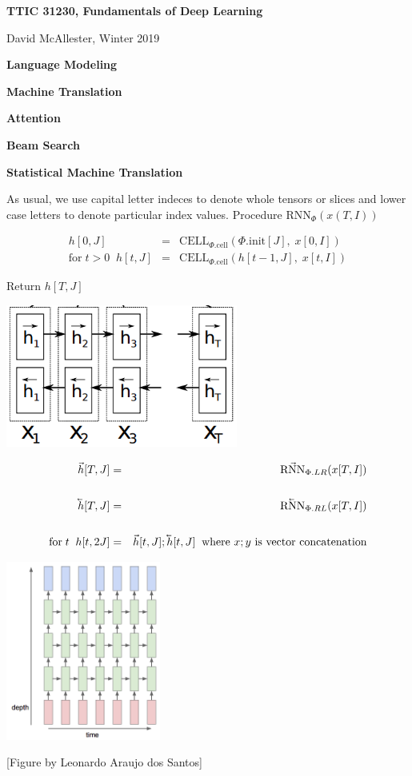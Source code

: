 




{\Huge

  \centerline{\bf TTIC 31230, Fundamentals of Deep Learning}
  \bigskip
  \centerline{David McAllester, Winter 2019}
  \vfill
  \centerline{\bf Language Modeling}
  \vfill
  \centerline{\bf Machine Translation}
  \vfill
  \centerline{\bf Attention}
  \vfill
  \centerline{\bf Beam Search}
  \vfill
  \centerline{\bf Statistical Machine Translation}

As usual, we use capital letter indeces to denote whole tensors or slices and lower case letters to denote particular index values.
\vfill
Procedure $\mathrm{RNN}_\Phi(x(T,I))$

\begin{eqnarray*}
h[0,J] &  = &  \mathrm{CELL}_{\Phi.\mathrm{cell}}(\Phi.\mathrm{init}[J],\;x[0,I]) \\
\mathrm{for}\;t>0\;\;h[t,J] &  =  & \mathrm{CELL}_{\Phi.\mathrm{cell}}(h[t-1,J],\;x[t,I])
\end{eqnarray*}

\vfill
Return $h[T,J]$




\centerline{\includegraphics[width = 3in]{../images/biRNN}}

\begin{eqnarray*}
\vec{h}[T,J] & = & \vec{\mathrm{RNN}}_{\Phi.LR}(x[T,I]) \\
\\
\cev{h}[T,J] & = & \cev{\mathrm{RNN}}_{\Phi.RL}(x[T,I]) \\
\\
\mbox{for}\;t\;\;h[t,2J] & = & \vec{h}[t,J];\cev{h}[t,J]\;\;\mbox{where $x;y$ is vector concatenation}
\end{eqnarray*}



\centerline{\includegraphics[width = 2in]{../images/RNNstack}}
\centerline{\large [Figure by Leonardo Araujo dos Santos]}

}
